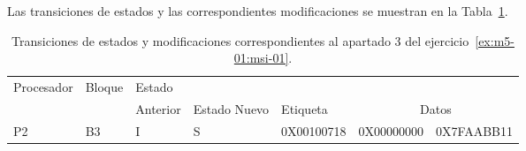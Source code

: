 Las transiciones de estados y las correspondientes modificaciones se muestran en la Tabla~\ref{ex:m5-01:msi-01:tabl:4}.

\begin{table}[htbp]

\begin{tabular}{|l|l|l|l|l|l|l|}

\hline
Procesador 	& Bloque 	& Estado 	& 		&  		& \multicolumn{2}{c|}{}\\
		&		& Anterior	& Estado Nuevo	& Etiqueta	& \multicolumn{2}{c|}{Datos}\\
\hline
\hline

P2 & B3 & I & S & 0X00100718 & 0X00000000 & 0X7FAABB11\\
\hline

\end{tabular}

\caption{Transiciones de estados y modificaciones correspondientes al apartado 3 del ejercicio~\ref{ex:m5-01:msi-01}.}
\label{ex:m5-01:msi-01:tabl:4}
\end{table}

